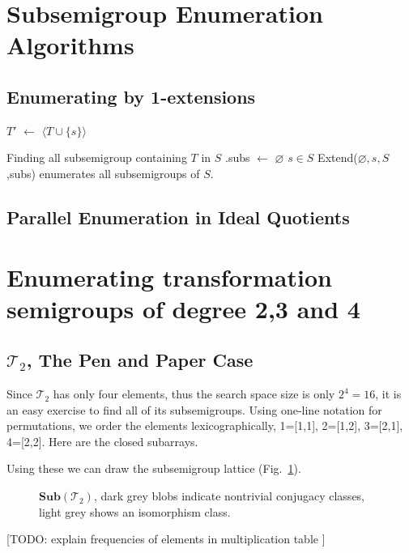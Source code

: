 \documentclass{amsart}
\newcommand{\cT}{{\mathcal T}}
\newcommand{\Sub}{\mathbf{Sub}}
\newcommand{\todo}[1]{ \small \textsf{[TODO:  #1 ]} \normalsize}
\theoremstyle{plain}
\theoremstyle{definition}
\begin{document}
\section{Subsemigroup Enumeration Algorithms}

\subsection{Enumerating by 1-extensions}

\begin{algorithm}
\BlankLine
\Name{}

$T'$ $\leftarrow$ $\langle T\cup\{s\}\rangle$\\
\caption{Finding all subsemigroup containing $T$ in $S$ .\textsf{subs} $\leftarrow$ $\varnothing$ $s\in S$ \textsf{Extend}($\varnothing,s,S$,\textsf{subs}) enumerates all subsemigroups of $S$.}
\label{alg:1-extensons}
\end{algorithm}

\subsection{Parallel Enumeration in Ideal Quotients}

\section{Enumerating transformation semigroups of degree 2,3 and 4}

\subsection{$\cT_2$, The Pen and Paper Case}
Since $\cT_2$ has only four elements, thus the search space size is only $2^4=16$, it is an easy exercise to find all of its subsemigroups. 
Using one-line notation for permutations, we order the elements lexicographically, 1=[1,1], 2=[1,2], 3=[2,1], 4=[2,2]. Here are the closed subarrays.

Using these we can draw the subsemigroup lattice (Fig.\ \ref{fig:T2subs}).

\begin{figure}

\caption{$\Sub(\cT_2)$, dark grey blobs indicate nontrivial conjugacy classes, light grey shows an isomorphism class.}
\label{fig:T2subs}
\end{figure}
\todo{explain frequencies of elements in multiplication table}



\end{document}
